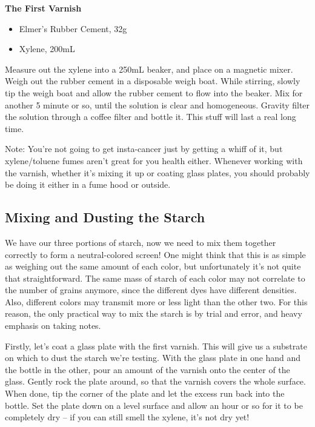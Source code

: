 \documentclass[11pt]{article}
\begin{document}
\textbf{The First Varnish}
\begin{itemize}
	\item Elmer's Rubber Cement, 32g
	\item Xylene, 200mL
\end{itemize}

Measure out the xylene into a 250mL beaker, and place on a magnetic mixer. Weigh out the rubber cement in a disposable weigh boat. While stirring, slowly tip the weigh boat and allow the rubber cement to flow into the beaker. Mix for another 5 minute or so, until the solution is clear and homogeneous. Gravity filter the solution through a coffee filter and bottle it. This stuff will last a real long time.\newline

Note: You're not going to get insta-cancer just by getting a whiff of it, but xylene/toluene fumes aren't great for you health either. Whenever working with the varnish, whether it's mixing it up or coating glass plates, you should probably be doing it either in a fume hood or outside.\newline

\subsection{Mixing and Dusting the Starch}

We have our three portions of starch, now we need to mix them together correctly to form a neutral-colored screen! One might think that this is as simple as weighing out the same amount of each color, but unfortunately it's not quite that straightforward. The same mass of starch of each color may not correlate to the number of grains anymore, since the different dyes have different densities. Also, different colors may transmit more or less light than the other two. For this reason, the only practical way to mix the starch is by trial and error, and heavy emphasis on taking notes.\newline

Firstly, let's coat a glass plate with the first varnish. This will give us a substrate on which to dust the starch we're testing. With the glass plate in one hand and the bottle in the other, pour an amount of the varnish onto the center of the glass. Gently rock the plate around, so that the varnish covers the whole surface. When done, tip the corner of the plate and let the excess run back into the bottle. Set the plate down on a level surface and allow an hour or so for it to be completely dry -- if you can still smell the xylene, it's not dry yet!\newline
\end{document}
